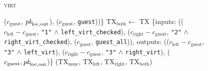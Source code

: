 \begin{figure}[H]
\begin{processbox}{\textsc{virt}}
\begin{algorithmic}[1]
        ($c_{\mathrm{guest}}$, $\textit{pk}_{\mathrm{loc}, \mathrm{out}}$),
        ($c_{\mathrm{guest}}$, \texttt{guest}))\}
        \State $\mathrm{TX}_{\mathrm{both}} \gets$ TX \{inputs:
        (($c_{\mathrm{left}} - c_{\mathrm{guest}}$, \texttt{"1"} $\wedge$
        \texttt{left\_virt\_checked}), ($c_{\mathrm{right}} -
        c_{\mathrm{guest}}$, \texttt{"2"} $\wedge$
        \texttt{right\_virt\_checked}), ($c_{\mathrm{guest}}$,
        \texttt{guest\_all})), outputs: (($c_{\mathrm{left}} -
        c_{\mathrm{guest}}$, \texttt{"3"} $\wedge$ \texttt{left\_virt}),
        ($c_{\mathrm{right}} - c_{\mathrm{guest}}$, \texttt{"3"} $\wedge$
        \texttt{right\_virt}), ($c_{\mathrm{guest}}, \textit{pk}_{\mathrm{loc},
        \mathrm{out}}$)\}
        \label{code:virtual-layer:mid-txs:both}
        \State \Return ($\mathrm{TX}_{\mathrm{none}}$,
        $\mathrm{TX}_{\mathrm{left}}$, $\mathrm{TX}_{\mathrm{right}}$,
        $\mathrm{TX}_{\mathrm{both}}$)
      \EndIndent
    \end{algorithmic}
  \end{processbox}
  \caption{}
  \label{code:virtual-layer:mid-txs}
\end{figure}

